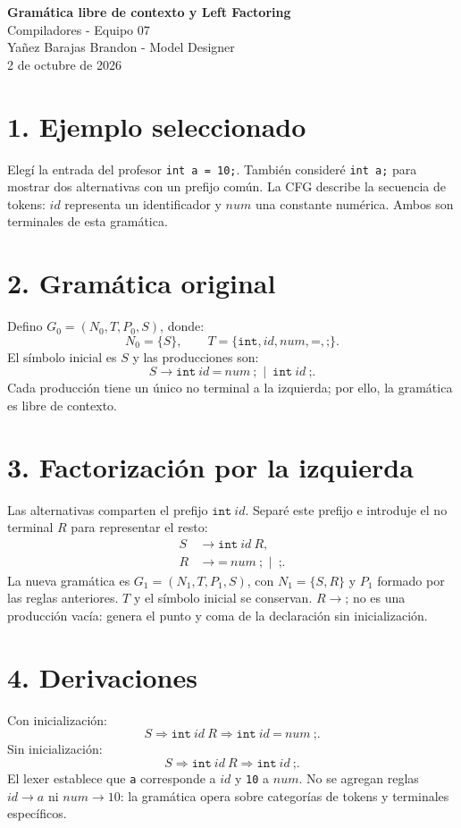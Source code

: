 \documentclass[11pt,letterpaper]{article}
\newcommand{\datos}[1]{\begin{center}{\Large\bfseries\color{navy}#1}\\[8pt]
Compiladores - Equipo 07\\Yañez Barajas Brandon - Model Designer\\2 de octubre de 2026\end{center}}
\newcommand{\tok}[1]{\texttt{#1}}
\begin{document}
\datos{Gramática libre de contexto y Left Factoring}
\section*{1. Ejemplo seleccionado}
Elegí la entrada del profesor \tok{int a = 10;}. También consideré \tok{int a;} para mostrar dos alternativas con un prefijo común. La CFG describe la secuencia de tokens: $id$ representa un identificador y $num$ una constante numérica. Ambos son terminales de esta gramática.

\section*{2. Gramática original}
Defino $G_0=(N_0,T,P_0,S)$, donde:
\[N_0=\{S\},\qquad T=\{\texttt{int},id,num,\texttt{=},\texttt{;}\}.\]
El símbolo inicial es $S$ y las producciones son:
\[S\to\texttt{int}\ id\ \texttt{=}\ num\ \texttt{;}\ \mid\ \texttt{int}\ id\ \texttt{;}.\]
Cada producción tiene un único no terminal a la izquierda; por ello, la gramática es libre de contexto.

\section*{3. Factorización por la izquierda}
Las alternativas comparten el prefijo $\texttt{int}\ id$. Separé este prefijo e introduje el no terminal $R$ para representar el resto:
\[\begin{aligned}S&\to\texttt{int}\ id\ R,\\R&\to\texttt{=}\ num\ \texttt{;}\ \mid\ \texttt{;}.\end{aligned}\]
La nueva gramática es $G_1=(N_1,T,P_1,S)$, con $N_1=\{S,R\}$ y $P_1$ formado por las reglas anteriores. $T$ y el símbolo inicial se conservan. $R\to\texttt{;}$ no es una producción vacía: genera el punto y coma de la declaración sin inicialización.

\section*{4. Derivaciones}
Con inicialización:
\[S\Rightarrow\texttt{int}\ id\ R\Rightarrow\texttt{int}\ id\ \texttt{=}\ num\ \texttt{;}.\]
Sin inicialización:
\[S\Rightarrow\texttt{int}\ id\ R\Rightarrow\texttt{int}\ id\ \texttt{;}.\]
El lexer establece que \tok{a} corresponde a $id$ y \tok{10} a $num$. No se agregan reglas $id\to a$ ni $num\to 10$: la gramática opera sobre categorías de tokens y terminales específicos.
\end{document}
